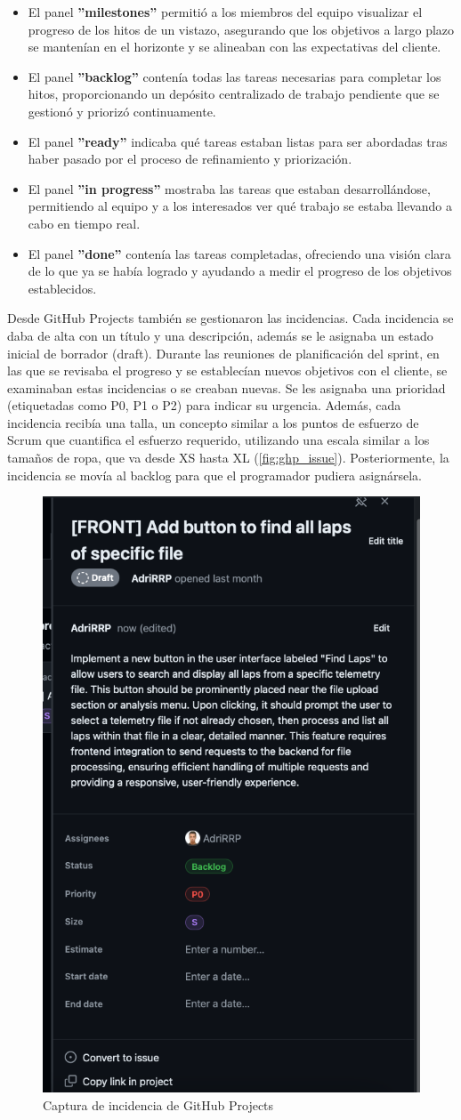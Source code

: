 \begin{itemize}[noitemsep]
\item El panel \textbf{''milestones''} permitió a los miembros del equipo visualizar el progreso de los hitos de un vistazo, asegurando que los objetivos a largo plazo se  mantenían en el horizonte y se alineaban con las expectativas del cliente.
\item El panel \textbf{''backlog''} contenía todas las tareas necesarias para completar los hitos, proporcionando un depósito centralizado de trabajo pendiente que se gestionó y priorizó continuamente.
\item El panel \textbf{''ready''} indicaba qué tareas estaban listas para ser abordadas tras haber pasado por el proceso de refinamiento y priorización.
\item El panel \textbf{''in progress''} mostraba las tareas que estaban desarrollándose, permitiendo al equipo y a los interesados ver qué trabajo se estaba llevando a cabo en tiempo real.
\item El panel \textbf{''done''} contenía las tareas completadas, ofreciendo una visión clara de lo que ya se había logrado y ayudando a medir el progreso de los objetivos establecidos.\\
\end{itemize}

Desde GitHub Projects también se gestionaron las incidencias. Cada incidencia se daba de alta con un título y una descripción, además se le asignaba un estado inicial de borrador (draft). Durante las reuniones de planificación del sprint, en las que se revisaba el progreso y se establecían nuevos objetivos con el cliente, se examinaban estas incidencias o se creaban nuevas. Se les asignaba una prioridad (etiquetadas como P0, P1 o P2) para indicar su urgencia. Además, cada incidencia recibía una talla, un concepto similar a los puntos de esfuerzo de Scrum que cuantifica el esfuerzo requerido, utilizando una escala similar a los tamaños de ropa, que va desde XS hasta XL (\autoref{fig:ghp_issue}). Posteriormente, la incidencia se movía al backlog para que el programador pudiera asignársela.

\begin{figure}[H]
	\centering
	\includegraphics[width=0.30\linewidth]{./figs/herramientas/desarrollo/ghproject_issue.png}
	\caption[Captura de incidencia de GitHub Projects]{Captura de incidencia de GitHub Projects}
    \label{fig:ghp_issue}
\end{figure}

